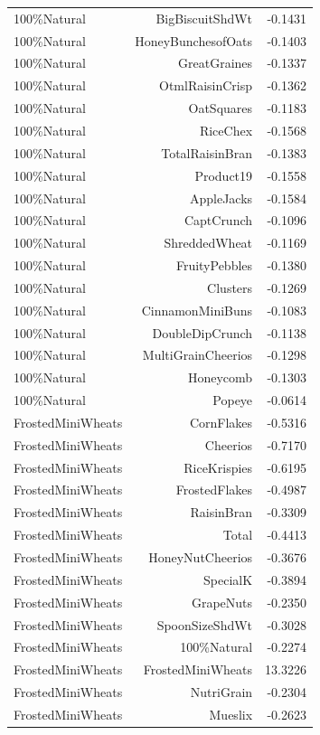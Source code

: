 \begin{longtable}{@{}lrr@{}}
100\%Natural & BigBiscuitShdWt & -0.1431 \\
100\%Natural & HoneyBunchesofOats & -0.1403 \\
100\%Natural & GreatGraines & -0.1337 \\
100\%Natural & OtmlRaisinCrisp & -0.1362 \\
100\%Natural & OatSquares & -0.1183 \\
100\%Natural & RiceChex & -0.1568 \\
100\%Natural & TotalRaisinBran & -0.1383 \\
100\%Natural & Product19 & -0.1558 \\
100\%Natural & AppleJacks & -0.1584 \\
100\%Natural & CaptCrunch & -0.1096 \\
100\%Natural & ShreddedWheat & -0.1169 \\
100\%Natural & FruityPebbles & -0.1380 \\
100\%Natural & Clusters & -0.1269 \\
100\%Natural & CinnamonMiniBuns & -0.1083 \\
100\%Natural & DoubleDipCrunch & -0.1138 \\
100\%Natural & MultiGrainCheerios & -0.1298 \\
100\%Natural & Honeycomb & -0.1303 \\
100\%Natural & Popeye & -0.0614 \\
FrostedMiniWheats & CornFlakes & -0.5316 \\
FrostedMiniWheats & Cheerios & -0.7170 \\
FrostedMiniWheats & RiceKrispies & -0.6195 \\
FrostedMiniWheats & FrostedFlakes & -0.4987 \\
FrostedMiniWheats & RaisinBran & -0.3309 \\
FrostedMiniWheats & Total & -0.4413 \\
FrostedMiniWheats & HoneyNutCheerios & -0.3676 \\
FrostedMiniWheats & SpecialK & -0.3894 \\
FrostedMiniWheats & GrapeNuts & -0.2350 \\
FrostedMiniWheats & SpoonSizeShdWt & -0.3028 \\
FrostedMiniWheats & 100\%Natural & -0.2274 \\
FrostedMiniWheats & FrostedMiniWheats & 13.3226 \\
FrostedMiniWheats & NutriGrain & -0.2304 \\
FrostedMiniWheats & Mueslix & -0.2623 \\

\end{longtable}
